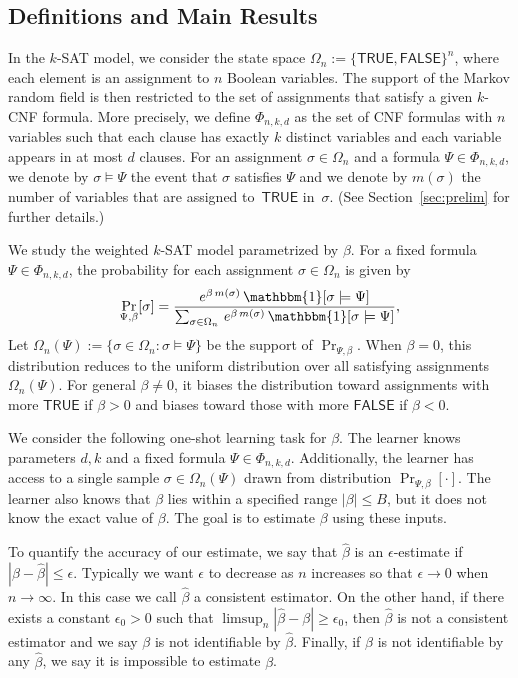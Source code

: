 \documentclass[11pt]{article}
\theoremstyle{definition}
\theoremstyle{remark}
\def\TRUE{\mathsf{TRUE}}
\def\FALSE{\mathsf{FALSE}}
\begin{document}
\subsection{Definitions and Main Results}

In the $k$-SAT model, we consider the state space $\Omega_n:=\{\TRUE, \FALSE\}^n$, where each element is an assignment to $n$ Boolean variables.
The support of the Markov random field is then restricted to the set of assignments that satisfy a given $k$-CNF formula.
More precisely, we define $\Phi_{n,k,d}$ as the set of CNF formulas with $n$ variables such that each clause has exactly $k$ distinct variables and each variable appears in at most $d$ clauses. For an assignment $\sigma\in \Omega_n$ and a formula $\Psi\in \Phi_{n,k,d}$, we denote by $\sigma \models \Psi$ the event that $\sigma$ satisfies $\Psi$ and we denote by $m(\sigma)$
the number of variables that are assigned to~$\TRUE$ in~$\sigma$. (See  Section~\ref{sec:prelim} for further details.)

We study the weighted $k$-SAT model parametrized by $\beta$. 
For a fixed formula $\Psi\in \Phi_{n,k,d}$, the probability for each assignment $\sigma\in \Omega_n$ is given by
\begin{equation}\label{eq:model}
    \Pr_{\Psi, \beta}[\sigma] = 
\frac{ e^{\beta \, m(\sigma)} \,\mathbbm{1}[\sigma \models \Psi]}{
\sum_{\sigma \in \Omega_n} \, e^{\beta \, m(\sigma)} \,\mathbbm{1}[\sigma \models \Psi]
},
\end{equation}
Let $\Omega_n(\Psi):=\{\sigma\in \Omega_n: \sigma\models \Psi\}$ be the support of $\Pr_{\Psi, \beta}$.
When $\beta=0$, this distribution reduces to the uniform distribution over all satisfying assignments $\Omega_n(\Psi)$. For general $\beta\neq 0$, it biases the distribution  toward assignments with more $\TRUE$ if $\beta>0$ and biases toward those with more $\FALSE$ if $\beta<0$. 

We consider the following one-shot learning task for  $\beta$. The learner knows parameters $d,k$ and a fixed formula $\Psi\in \Phi_{n,k,d}$.  Additionally, the learner has access to a single sample  $\sigma \in \Omega_n(\Psi)$ drawn from distribution $\Pr_{\Psi,\beta}[\cdot]$. The learner also knows that $\beta$ lies within a specified range $|\beta|\le B$, but it does not know the exact value of $\beta$. The goal is to estimate $\beta$ using these inputs.

To quantify the accuracy of our estimate, we say that $\hat{\beta}$ is an $\epsilon$-estimate if $|\beta-\hat{\beta}|\le \epsilon$. Typically we want $\epsilon$ to  decrease as $n$ increases so that $\epsilon\rightarrow0$ when $n\rightarrow \infty$. In this case we call $\hat{\beta}$ a consistent estimator. 
On the other hand, if there exists a constant $\epsilon_0>0$ such that 
$\limsup_n |\hat{\beta} - \beta| \ge \epsilon_0$, then $\hat{\beta}$ is not a consistent estimator and we say $\beta$ is not identifiable by $\hat{\beta}$. Finally,  if $\beta$ is not identifiable by any $\hat{\beta}$, we say it is impossible to estimate $\beta$.
 
\end{document}
